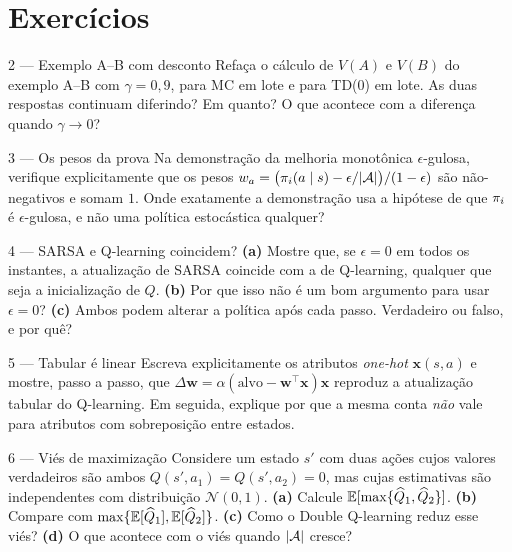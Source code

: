 \documentclass[11pt]{article}
\newcommand{\Qhat}{\widehat{Q}}
\newcommand{\wv}{\mathbf{w}}
\newcommand{\xv}{\mathbf{x}}
\begin{document}
\section{Exercícios}

\begin{exbox}{2 — Exemplo A--B com desconto}
  Refaça o cálculo de $V(A)$ e $V(B)$ do exemplo A--B com $\gamma = 0{,}9$,
  para MC em lote e para TD(0) em lote. As duas respostas continuam diferindo?
  Em quanto? O que acontece com a diferença quando $\gamma \to 0$?
\end{exbox}

\begin{exbox}{3 — Os pesos da prova}
  Na demonstração da melhoria monotônica $\epsilon$-gulosa, verifique
  explicitamente que os pesos
  $w_a = \bigl(\pi_i(a\mid s) - \epsilon/\lvert\mathcal{A}\rvert\bigr)/(1-\epsilon)$
  são não-negativos e somam $1$. Onde exatamente a demonstração usa a hipótese
  de que $\pi_i$ é $\epsilon$-gulosa, e não uma política estocástica qualquer?
\end{exbox}

\begin{exbox}{4 — SARSA e Q-learning coincidem?}
  \textbf{(a)} Mostre que, se $\epsilon = 0$ em todos os instantes, a
  atualização de SARSA coincide com a de Q-learning, qualquer que seja a
  inicialização de $Q$. \textbf{(b)} Por que isso não é um bom argumento para
  usar $\epsilon = 0$? \textbf{(c)} Ambos podem alterar a política após cada
  passo. Verdadeiro ou falso, e por quê?
\end{exbox}

\begin{exbox}{5 — Tabular é linear}
  Escreva explicitamente os atributos \emph{one-hot} $\xv(s,a)$ e mostre, passo
  a passo, que $\Delta\wv = \alpha(\text{alvo} - \wv^{\top}\xv)\xv$ reproduz a
  atualização tabular do Q-learning. Em seguida, explique por que a mesma conta
  \emph{não} vale para atributos com sobreposição entre estados.
\end{exbox}

\begin{exbox}{6 — Viés de maximização}
  Considere um estado $s'$ com duas ações cujos valores verdadeiros são ambos
  $Q(s',a_1) = Q(s',a_2) = 0$, mas cujas estimativas são independentes com
  distribuição $\mathcal{N}(0,1)$. \textbf{(a)} Calcule
  $\E[\max\{\Qhat_1,\Qhat_2\}]$. \textbf{(b)} Compare com
  $\max\{\E[\Qhat_1], \E[\Qhat_2]\}$. \textbf{(c)} Como o Double Q-learning
  reduz esse viés? \textbf{(d)} O que acontece com o viés quando $\lvert\mathcal{A}\rvert$
  cresce?
\end{exbox}
\end{document}
